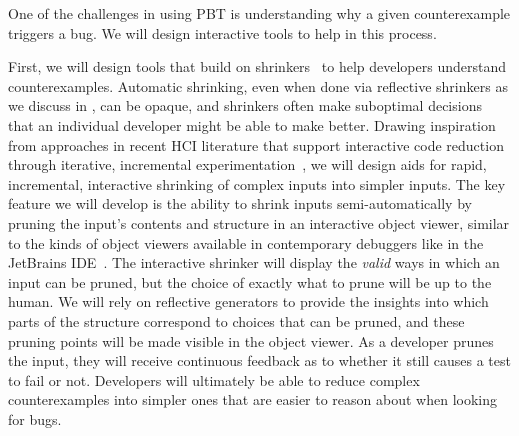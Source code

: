 
%
One of the challenges in using PBT is understanding why
a given counterexample triggers a bug.  We will design interactive
tools to help in this process.

First, we will design tools that build on
shrinkers~\cite{hughes_quickcheck_2007,arts_shrinking_2014} to help developers
understand counterexamples. Automatic shrinking, even when done via reflective
shrinkers as we discuss in , can be opaque, and
shrinkers often make suboptimal decisions that an individual developer might be
able to make better.
Drawing inspiration from approaches in recent HCI literature that support
interactive code reduction through iterative, incremental
experimentation~\cite{ref:lim2018ply,ref:head2018interactive,ref:holmes2012systematizing,ref:hibschman2016telescope},
we will design aids for rapid, incremental, interactive shrinking of complex
inputs into simpler inputs. The key feature we will develop is the ability to
shrink inputs semi-automatically by pruning the input's contents and structure in an interactive
object viewer, similar to the kinds of object viewers available in contemporary
debuggers like in the JetBrains IDE~\cite{tool:jetbrains}.
The interactive shrinker will display the \emph{valid} ways
in which an input can be pruned, but the choice of exactly what to prune will be
up to the human. We will rely on reflective generators to provide the insights
into which parts of the structure correspond to choices that can be pruned, and
these pruning points will be made
visible in the object viewer. As a developer prunes the input, they will receive
continuous feedback as to whether it still causes a test to fail or not.
Developers will ultimately be able to
reduce complex counterexamples into simpler ones that are
easier to reason about when looking for bugs.



